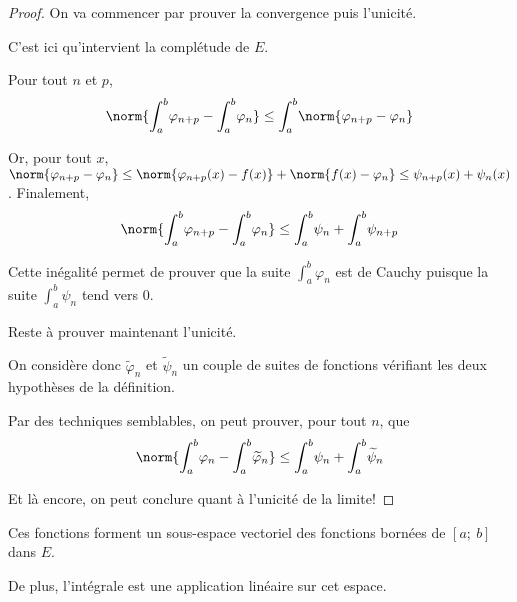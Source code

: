 \begin{proof}
On va commencer par prouver la convergence puis l'unicité.

C'est ici qu'intervient la complétude de $E$.

Pour tout $n$ et $p$, 
\[\norm{\displaystyle{\int_a^b} \varphi_{n+p} - \displaystyle{\int_a^b} \varphi_{n}} \leq  \displaystyle{\int_a^b} \norm{\varphi_{n+p}-\varphi_{n}}\]

Or, pour tout $x$, $\norm{\varphi_{n+p}-\varphi_{n}} \leq \norm{\varphi_{n+p}(x)-f(x)}+\norm{f(x)-\varphi_{n}} \leq \psi_{n+p}(x)+\psi_{n}(x)$. Finalement,
\[
\norm{\displaystyle{\int_a^b} \varphi_{n+p} - \displaystyle{\int_a^b} \varphi_{n}} \leq \displaystyle{\int_a^b} \psi_{n} + \displaystyle{\int_a^b} \psi_{n+p}
\]

Cette inégalité permet de prouver que la suite $\displaystyle{\int_a^b} \varphi_{n}$ est de Cauchy puisque la suite $\displaystyle{\int_a^b} \psi_{n}$ tend vers $0$.

Reste à prouver maintenant l'unicité.

On considère donc $\tilde{\varphi}_n$ et $\tilde{\psi}_n$ un couple de suites de fonctions vérifiant les deux hypothèses de la définition.

Par des techniques semblables, on peut prouver, pour tout $n$, que
\[
\norm{\displaystyle{\int_a^b} \varphi_{n} - \displaystyle{\int_a^b} \widetilde{\varphi}_{n}} \leq \displaystyle{\int_a^b} \psi_{n} + \displaystyle{\int_a^b} \widetilde{\psi}_{n}
\]

Et là encore, on peut conclure quant à l'unicité de la limite!


\end{proof}

\begin{prop}
Ces fonctions forment un sous-espace vectoriel des fonctions bornées de $[a;~b]$ dans $E$. 

De plus, l'intégrale est une application linéaire sur cet espace.
\end{prop}

